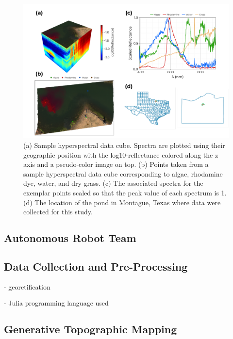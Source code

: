 \documentclass[remotesensing,article,submit,pdftex,moreauthors]{Definitions/mdpi}
\begin{document}
\begin{figure}[t]
\centering
\includegraphics[width=\columnwidth]{paper/figures/methods/sample-spectra.pdf}
\caption{(a) Sample hyperspectral data cube. Spectra are plotted using their geographic position with the log10-reflectance colored along the z axis and a pseudo-color image on top. (b) Points taken from a sample hyperspectral data cube corresponding to algae, rhodamine dye, water, and dry grass. (c) The associated spectra for the exemplar points scaled so that the peak value of each spectrum is 1. (d) The location of the pond in Montague, Texas where data were collected for this study.\label{fig:sample-spectra}}
\end{figure}  


\subsection{Autonomous Robot Team}
\subsection{Data Collection and Pre-Processing}

- georetification \cite{muller2002program, baumker2001new, mostafa2000multi}

- Julia programming language used \cite{bezanson2012julia}

\subsection{Generative Topographic Mapping}
\end{document}
